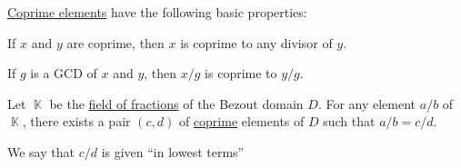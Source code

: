\begin{proposition}\label{thm:def:coprime_elements}
  \hyperref[def:coprime_elements]{Coprime elements} have the following basic properties:
  \begin{thmenum}
     If \( x \) and \( y \) are coprime, then \( x \) is coprime to any divisor of \( y \).

     If \( g \) is a GCD of \( x \) and \( y \), then \( x / g \) is coprime to \( y / g \).

     Let \( \BbbK \) be the \hyperref[thm:field_of_fractions]{field of fractions} of the Bezout domain \( D \). For any element \( a / b \) of \( \BbbK \), there exists a pair \( (c, d) \) of \hyperref[def:coprime_elements]{coprime} elements of \( D \) such that \( a / b = c / d \).

    We say that \( c / d \) is given \enquote{in lowest terms}
  \end{thmenum}
\end{proposition}
